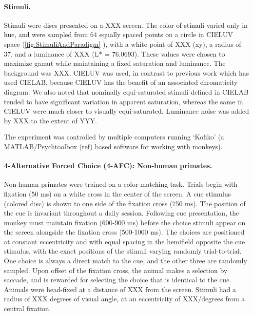 \paragraph{Stimuli.} 
Stimuli were discs presented on a XXX screen.
The color of stimuli varied only in hue, and were sampled from 64 equally spaced points on a circle in CIELUV space (\autoref{fig:StimuliAndParadigm}%
), with a white point of XXX (xy), a radius of 37, and a luminance of XXX (L* = 76.0693). These values were chosen to maximize gamut while maintaining a fixed saturation and luminance. The background was XXX.
CIELUV was used, in contrast to previous work which has used CIELAB, because CIELUV has the benefit of an associated chromaticity diagram. 
We also noted that nominally equi-saturated stimuli defined in CIELAB tended to have significant variation in apparent saturation, whereas the same in CIELUV were much closer to visually equi-saturated. 
Luminance noise was added by XXX to the extent of YYY.


The experiment was controlled by multiple computers running `Kofiko' (a MATLAB/Psychtoolbox (ref) based software for working with monkeys).

\paragraph{4-Alternative Forced Choice (4-AFC): Non-human primates.} Non-human primates were trained on a color-matching task. Trials begin with fixation (50 ms) on a white cross in the center of the screen. A cue stimulus (colored disc) is shown to one side of the fixation cross (750 ms). The position of the cue is invariant throughout a daily session. Following cue presentation, the monkey must maintain fixation (600-900 ms) before the choice stimuli appear on the screen alongside the fixation cross (500-1000 ms). The choices are positioned at constant eccentricity and with equal spacing in the hemifield opposite the cue stimulus, with the exact positions of the stimuli varying randomly trial-to-trial. One choice is always a direct match to the cue, and the other three are randomly sampled. Upon offset of the fixation cross, the animal makes a selection by saccade, and is rewarded for selecting the choice that is identical to the cue. Animals were head-fixed at a distance of XXX from the screen. Stimuli had a radius of XXX degrees of visual angle, at an eccentricity of XXX/degrees from a central fixation.

